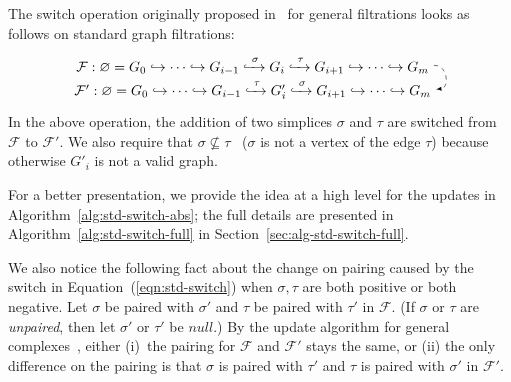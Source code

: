 \documentclass[letterpaper,11pt]{article}
\theoremstyle{mythmstyle}
\theoremstyle{mydefstyle}
\theoremstyle{plain}
\theoremstyle{definition}
\newcommand{\<}[1]{\langle #1\rangle}
\newcommand{\lbarrowspace}{\;}
\newcommand{\incto}{\hookrightarrow}
\newcommand{\inctosp}[1]{\xhookrightarrow{\lbarrowspace#1\lbarrowspace}}
\let\emptyset\varnothing
\newcommand{\Fcal}{\mathcal{F}}
\newcommand{\sG}{\sigma}
\newcommand{\tG}{\tau}
\newcommand{\filtcnt}{m}
\theoremstyle{definition}
\begin{document}
The switch operation originally proposed in~\cite{cohen2006vines} for
general filtrations looks as follows on standard graph filtrations:
\begin{equation}\label{eqn:std-switch}
\begin{tikzpicture}[baseline=(current  bounding  box.center)]
\tikzstyle{every node}=[minimum width=24em]
\node (a) at (0,0) {$\Fcal: \emptyset= G_0 \incto
\cdots
\incto
G_{i-1}\inctosp{\sG} 
G_i 
\inctosp{\tG} G_{i+1}
\incto
\cdots \incto G_\filtcnt$}; 
\node (b) at (0,-0.6){$\Fcal': \emptyset= G_0 \incto
\cdots
\incto 
G_{i-1}\inctosp{\tG} 
G'_i 
\inctosp{\sG} G_{i+1}
\incto
\cdots \incto G_\filtcnt$};
\path[->] (a.0) edge [bend left=90,looseness=1.5,arrows={-latex},dashed] (b.0);
\end{tikzpicture}
\end{equation}
In the above operation, 
the addition of two simplices 
$\sG$ and $\tG$
are switched from $\Fcal$ to $\Fcal'$.
We also require that $\sG\not\subseteq\tG$~\cite{cohen2006vines} ($\sG$ is not a vertex of the edge $
\tG$)
because otherwise $G'_i$ is not a valid graph.

For a better presentation, 
we provide the idea at a high level for the updates
in Algorithm~\ref{alg:std-switch-abs};
the full details are presented in 
Algorithm~\ref{alg:std-switch-full} in Section~\ref{sec:alg-std-switch-full}.

We also notice the following fact about the change on pairing 
caused by 
the switch in Equation~(\ref{eqn:std-switch})
when $\sG,\tG$ are both positive or both negative.
Let $\sG$ be paired with $\sG'$ and 
$\tG$ be paired with $\tG'$ in $\Fcal$. (If $\sG$ or $\tG$ are \emph{unpaired},
then let $\sG'$ or $\tG'$ be $null$.)
By the update algorithm for general complexes~\cite{cohen2006vines},
either (i)~the pairing for $\Fcal$ and $\Fcal'$ stays the same,
or (ii) the only difference on the pairing is that
$\sG$ is paired with $\tG'$ and
$\tG$ is paired with $\sG'$ in $\Fcal'$.
\end{document}
